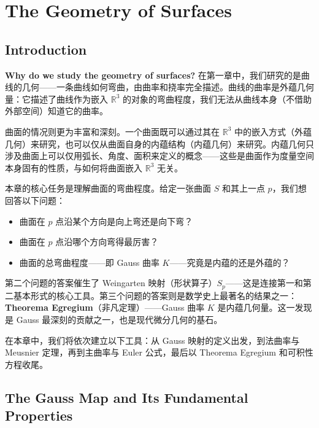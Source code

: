 \chapter{The Geometry of Surfaces}\label{chap:ch3}

\section*{Introduction}\label{sec:ch3-intro}

\textbf{Why do we study the geometry of surfaces?} 在第一章中，我们研究的是曲线的几何——一条曲线如何弯曲，由曲率和挠率完全描述。曲线的曲率是外蕴几何量：它描述了曲线作为嵌入 $\mathbb{R}^3$ 的对象的弯曲程度，我们无法从曲线本身（不借助外部空间）知道它的曲率。

曲面的情况则更为丰富和深刻。一个曲面既可以通过其在 $\mathbb{R}^3$ 中的嵌入方式（外蕴几何）来研究，也可以仅从曲面自身的内蕴结构（内蕴几何）来研究。内蕴几何只涉及曲面上可以仅用弧长、角度、面积来定义的概念——这些是曲面作为度量空间本身固有的性质，与如何将曲面嵌入 $\mathbb{R}^3$ 无关。

本章的核心任务是理解曲面的弯曲程度。给定一张曲面 $S$ 和其上一点 $p$，我们想回答以下问题：

\begin{itemize}
    \item 曲面在 $p$ 点沿某个方向是向上弯还是向下弯？
    \item 曲面在 $p$ 点沿哪个方向弯得最厉害？
    \item 曲面的总弯曲程度——即 Gauss 曲率 $K$——究竟是内蕴的还是外蕴的？
\end{itemize}

第二个问题的答案催生了 Weingarten 映射（形状算子）$S_p$——这是连接第一和第二基本形式的核心工具。第三个问题的答案则是数学史上最著名的结果之一：\textbf{Theorema Egregium}（非凡定理）——Gauss 曲率 $K$ 是内蕴几何量。这一发现是 Gauss 最深刻的贡献之一，也是现代微分几何的基石。

在本章中，我们将依次建立以下工具：从 Gauss 映射的定义出发，到法曲率与 Meusnier 定理，再到主曲率与 Euler 公式，最后以 Theorema Egregium 和可积性方程收尾。

\section{The Gauss Map and Its Fundamental Properties}\label{sec:gauss-map}

